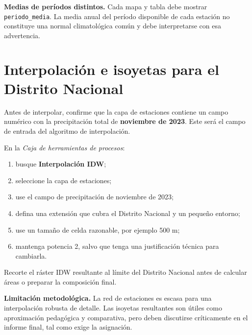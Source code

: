 \documentclass[11pt]{article}
\begin{document}
\begin{warnbox}
\textbf{Medias de períodos distintos.}
Cada mapa y tabla debe mostrar \texttt{periodo\_media}. La media anual del
período disponible de cada estación no constituye una normal climatológica
común y debe interpretarse con esa advertencia.
\end{warnbox}

\section{Interpolación e isoyetas para el Distrito Nacional}


Antes de interpolar, confirme que la capa de estaciones contiene un campo numérico
con la precipitación total de \textbf{noviembre de 2023}. Este será el campo de
entrada del algoritmo de interpolación.


En la \emph{Caja de herramientas de procesos}:
\begin{enumerate}
  \item busque \textbf{Interpolación IDW};
  \item seleccione la capa de estaciones;
  \item use el campo de precipitación de noviembre de 2023;
  \item defina una extensión que cubra el Distrito Nacional y un pequeño entorno;
  \item use un tamaño de celda razonable, por ejemplo 500 m;
  \item mantenga potencia 2, salvo que tenga una justificación técnica para cambiarla.
\end{enumerate}

Recorte el ráster IDW resultante al límite del Distrito Nacional antes de
calcular áreas o preparar la composición final.

\begin{warnbox}
\textbf{Limitación metodológica.}
La red de estaciones es escasa para una interpolación robusta de detalle. Las
isoyetas resultantes son útiles como aproximación pedagógica y comparativa, pero
deben discutirse críticamente en el informe final, tal como exige la asignación.
\end{warnbox}

\end{document}
